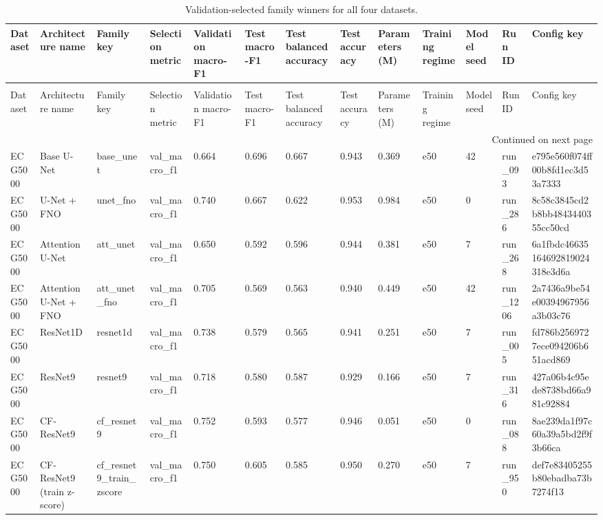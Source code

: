 \begin{longtable}{lllllllllllll}
\caption{Validation-selected family winners for all four datasets.} \label{tab:all_datasets_best_model_performance} \\
\toprule
Dataset & Architecture name & Family key & Selection metric & Validation macro-F1 & Test macro-F1 & Test balanced accuracy & Test accuracy & Parameters (M) & Training regime & Model seed & Run ID & Config key \\
\midrule
\endfirsthead
\caption[]{Validation-selected family winners for all four datasets.} \\
\toprule
Dataset & Architecture name & Family key & Selection metric & Validation macro-F1 & Test macro-F1 & Test balanced accuracy & Test accuracy & Parameters (M) & Training regime & Model seed & Run ID & Config key \\
\midrule
\endhead
\midrule
\multicolumn{13}{r}{Continued on next page} \\
\midrule
\endfoot
\bottomrule
\endlastfoot
ECG5000 & Base U-Net & base\_unet & val\_macro\_f1 & 0.664 & 0.696 & 0.667 & 0.943 & 0.369 & e50 & 42 & run\_093 & e795e560f074ff00b8fd1ec3d53a7333 \\
ECG5000 & U-Net + FNO & unet\_fno & val\_macro\_f1 & 0.740 & 0.667 & 0.622 & 0.953 & 0.984 & e50 & 0 & run\_286 & 8c58c3845cd2b8bb4843440355cc50cd \\
ECG5000 & Attention U-Net & att\_unet & val\_macro\_f1 & 0.650 & 0.592 & 0.596 & 0.944 & 0.381 & e50 & 7 & run\_268 & 6a1fbdc46635164692819024318e3d6a \\
ECG5000 & Attention U-Net + FNO & att\_unet\_fno & val\_macro\_f1 & 0.705 & 0.569 & 0.563 & 0.940 & 0.449 & e50 & 42 & run\_1206 & 2a7436a9be54e00394967956a3b03c76 \\
ECG5000 & ResNet1D & resnet1d & val\_macro\_f1 & 0.738 & 0.579 & 0.565 & 0.941 & 0.251 & e50 & 7 & run\_005 & fd786b2569727ece094206b651acd869 \\
ECG5000 & ResNet9 & resnet9 & val\_macro\_f1 & 0.718 & 0.580 & 0.587 & 0.929 & 0.166 & e50 & 7 & run\_316 & 427a06b4c95ede8738bd66a981c92884 \\
ECG5000 & CF-ResNet9 & cf\_resnet9 & val\_macro\_f1 & 0.752 & 0.593 & 0.577 & 0.946 & 0.051 & e50 & 0 & run\_088 & 8ae239da1f97c60a39a5bd2f9f3b66ca \\
ECG5000 & CF-ResNet9 (train z-score) & cf\_resnet9\_train\_zscore & val\_macro\_f1 & 0.750 & 0.605 & 0.585 & 0.950 & 0.270 & e50 & 7 & run\_950 & def7e83405255b80ebadba73b7274f13 \\

\end{longtable}
